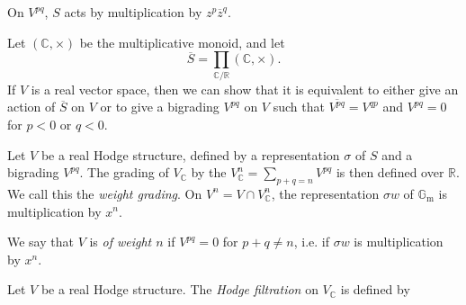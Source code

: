     \label{hodge-theory-ii-2.1.5.1}\par{}On \(V^{pq}\), \(S\) acts by multiplication by \(z^p\overline {z}^q\).\label{hodge-theory-ii-2.1.6}\par{}Let \((\mathbb {C},\times )\) be the multiplicative monoid, and let
    \[       \overline {S}       = \prod _{\mathbb {C}{/}\mathbb {R}} (\mathbb {C},\times ).     \]
    If \(V\) is a real vector space, then we can show that it is equivalent to either give an action of \(\overline {S}\) on \(V\) or to give a bigrading \(V^{pq}\) on \(V\) such that \(\overline {V^{pq}}=V^{qp}\) and \(V^{pq}=0\) for \(p<0\) or \(q<0\).\label{hodge-theory-ii-2.1.7}\par{}Let \(V\) be a real Hodge structure, defined by a representation \(\sigma \) of \(S\) and a bigrading \(V^{pq}\).
    The grading of \(V_\mathbb {C}\) by the \(V_\mathbb {C}^n=\sum _{p+q=n}V^{pq}\) is then defined over \(\mathbb {R}\).
    We call this the \emph{weight grading}.
    On \(V^n=V\cap  V_\mathbb {C}^n\), the representation \(\sigma  w\) of \(\mathbb {G}_\mathrm {m}\) is multiplication by \(x^n\).\par{}We say that \(V\) is \emph{of weight \(n\)} if \(V^{pq}=0\) for \(p+q\neq  n\), i.e. if \(\sigma  w\) is multiplication by \(x^n\).\label{hodge-theory-ii-2.1.8}\par{}Let \(V\) be a real Hodge structure.
    The \emph{Hodge filtration} on \(V_\mathbb {C}\) is defined by
